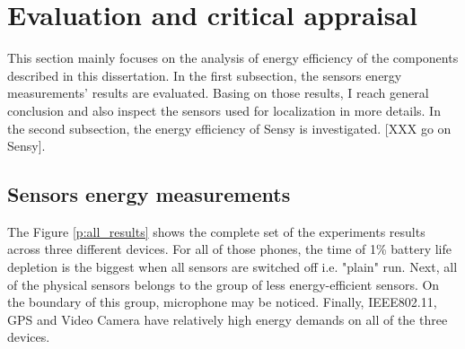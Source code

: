 \section{Evaluation and critical appraisal}
\label{s:evaluation}

\hspace{10pt} This section mainly focuses on the analysis of energy efficiency of the components described in this dissertation. In the first subsection, the sensors energy measurements' results are evaluated. Basing on those results, I reach general conclusion and also inspect the sensors used for localization in more details.  In the second subsection, the energy efficiency of Sensy is investigated. [XXX go on Sensy].

\subsection{Sensors energy measurements}

\hspace{10pt} The Figure \ref{p:all_results} shows the complete set of the experiments results across three different devices. For all of those phones, the time of 1\% battery life depletion is the biggest when all sensors are switched off i.e. "plain" run. Next, all of the physical sensors belongs to the group of less energy-efficient sensors. On the boundary of this group, microphone may be noticed. Finally, IEEE802.11, GPS and Video Camera have relatively high energy demands on all of the three devices.

